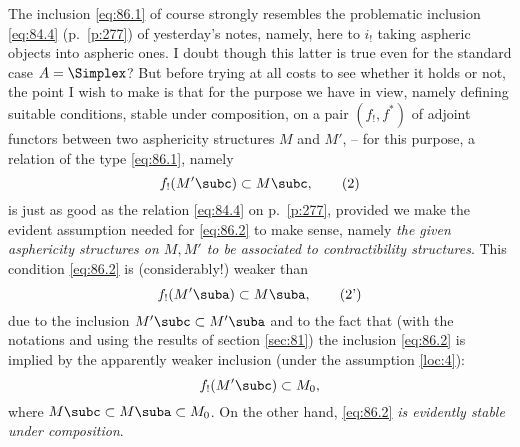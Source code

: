 The inclusion \eqref{eq:86.1} of course strongly resembles the
problematic inclusion \eqref{eq:84.4} (p.\ \ref{p:277}) of yesterday's
notes, namely, here to $i_!$ taking aspheric objects into aspheric
ones. I doubt though this latter is true even for the standard case
$A=\Simplex$? But before trying at all costs to see whether it holds
or not, the point I wish to make is that for the purpose we have in
view, namely defining suitable conditions, stable under composition,
on a pair $(f_!,f^*)$ of adjoint functors between two asphericity
structures $M$ and $M'$, -- for this purpose, a relation of the type
\eqref{eq:86.1}, namely
\begin{equation}
  \label{eq:86.2}
  f_!(M'\subc) \subset M\subc,\tag{2}
\end{equation}
is just as good as the relation \eqref{eq:84.4} on p.\ \ref{p:277},
provided we make the evident assumption needed for \eqref{eq:86.2} to
make sense, namely \emph{the given asphericity structures on $M,M'$ to
  be associated to contractibility structures}. This condition
\eqref{eq:86.2} is (considerably!) weaker than
\begin{equation}
  \label{eq:86.2prime}
  f_!(M'\suba)\subset M\suba,\tag{2'}
\end{equation}
due to the inclusion $M'\subc\subset M'\suba$ and to the fact that
(with the notations and using the results of section \ref{sec:81}) the
inclusion \eqref{eq:86.2} is implied by the apparently weaker
inclusion (under the assumption \ref{loc:4}):
\[f_!(M'\subc)\subset M_0,\]
where $M\subc\subset M\suba\subset M_0$. On the other hand,
\eqref{eq:86.2} \emph{is evidently stable under composition}.

